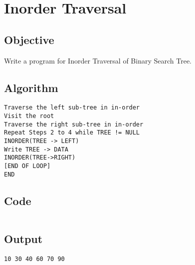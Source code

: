 \section{Inorder Traversal}
\label{sec:Inorder Traversal}

\subsection{Objective}
Write a program for Inorder Traversal of Binary Search Tree.

\subsection{Algorithm}
\begin{lstlisting}[style=mystyle]
Traverse the left sub-tree in in-order
Visit the root
Traverse the right sub-tree in in-order
Repeat Steps 2 to 4 while TREE != NULL
INORDER(TREE -> LEFT)
Write TREE -> DATA
INORDER(TREE->RIGHT)
[END OF LOOP]
END
\end{lstlisting}

\subsection{Code}
\inputminted[]{c}{../../Code/inorder.c}

\subsection{Output}
\begin{lstlisting}[style=output]
    10 30 40 60 70 90
\end{lstlisting}

\pagebreak
